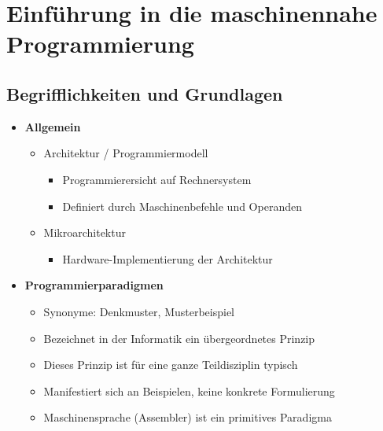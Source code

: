 \section{Einführung in die maschinennahe Programmierung}

\subsection{Begrifflichkeiten und Grundlagen}
    \begin{itemize}
        \item \textbf{Allgemein}
            \begin{itemize}
                \item Architektur / Programmiermodell
                    \begin{itemize}
                        \item Programmierersicht auf Rechnersystem 
                        \item Definiert durch Maschinenbefehle und Operanden
                    \end{itemize}
                \item Mikroarchitektur
                    \begin{itemize}
                        \item Hardware-Implementierung der Architektur
                    \end{itemize}
            \end{itemize}
        
        \item \textbf{Programmierparadigmen}
            \begin{itemize}
                \item Synonyme: Denkmuster, Musterbeispiel
                \item Bezeichnet in der Informatik ein übergeordnetes Prinzip
                \item Dieses Prinzip ist für eine ganze Teildisziplin typisch
                \item Manifestiert sich an Beispielen, keine konkrete Formulierung
                \item Maschinensprache (Assembler) ist ein primitives Paradigma              
            \end{itemize}


\end{itemize}
